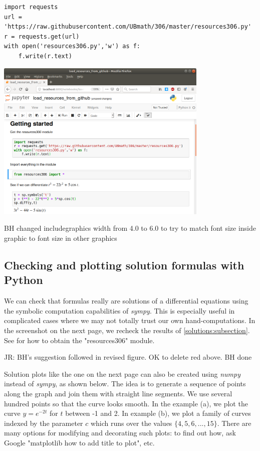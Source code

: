 \documentclass[12pt]{book}
\begin{document}
\begin{small}
\begin{verbatim}
import requests
url = 'https://raw.githubusercontent.com/UBmath/306/master/resources306.py'
r = requests.get(url)
with open('resources306.py','w') as f:
    f.write(r.text)
\end{verbatim}
\end{small}

\parbox[c]{3.1in}{\includegraphics[width=4.0in]{additional_figures/Introduction_to_differential_equations__getting_started}}

{\color{teal}BH changed includegraphics width from 4.0 to 6.0 to try to match font size inside graphic to font size in other graphics}


\subsection {Checking and plotting solution formulas with Python}

We can check that formulas really are solutions of a differential equations using the symbolic
computation capabilities of \emph{sympy}. This is especially useful in complicated cases
where we may not totally trust our own hand-computations. In the screenshot on the next page, we recheck the results of \ref{solutions:subsection}.
See  for how to obtain the "resources306" module.


{\color{teal}JR: BH's suggestion followed in revised figure. OK to delete red above. BH done}

Solution plots like the one on the next page can also be created using \emph{numpy} instead of \emph{sympy}, as shown below.
The idea is to generate a sequence of points along the graph and join them with straight line segments. 
We use several hundred points so that the curve looks smooth. In the example (a),
we plot the curve $y = e^{-2t}$ for $t$ between -1 and 2. In example (b), we plot a
family of curves indexed by the parameter $c$ which runs over the values $\{4, 5, 6, ..., 15\}$.
There are many options for modifying and decorating such plots: to find out how, ask Google "matplotlib how to add title to plot", etc.
\end{document}
